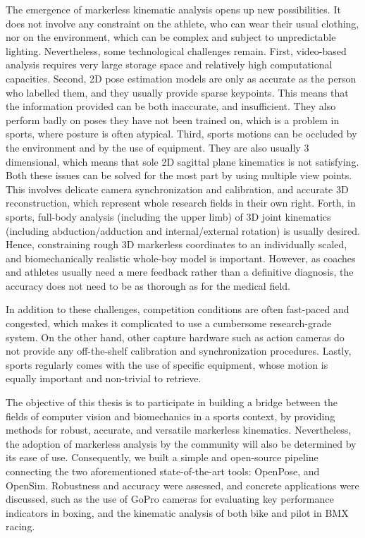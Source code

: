 The emergence of markerless kinematic analysis opens up new possibilities. It does not involve any constraint on the athlete, who can wear their usual clothing, nor on the environment, which can be complex and subject to unpredictable lighting. Nevertheless, some technological challenges remain. First, video-based analysis requires very large storage space and relatively high computational capacities. Second, 2D pose estimation models are only as accurate as the person who labelled them, and they usually provide sparse keypoints. This means that the information provided can be both inaccurate, and insufficient. They also perform badly on poses they have not been trained on, which is a problem in sports, where posture is often atypical. Third, sports motions can be occluded by the environment and by the use of equipment. They are also usually 3 dimensional, which means that sole 2D sagittal plane kinematics is not satisfying. Both these issues can be solved for the most part by using multiple view points. This involves delicate camera synchronization and calibration, and accurate 3D reconstruction, which represent whole research fields in their own right. Forth, in sports, full-body analysis (including the upper limb) of 3D joint kinematics (including abduction/adduction and internal/external rotation) is usually desired. Hence, constraining rough 3D markerless coordinates to an individually scaled, and biomechanically realistic whole-boy model is important. However, as coaches and athletes usually need a mere feedback rather than a definitive diagnosis, the accuracy does not need to be as thorough as for the medical field. 

In addition to these challenges, competition conditions are often fast-paced and congested, which makes it complicated to use a cumbersome research-grade system. On the other hand, other capture hardware such as action cameras do not provide any off-the-shelf calibration and synchronization procedures. Lastly, sports regularly comes with the use of specific equipment, whose motion is equally important and non-trivial to retrieve. 

The objective of this thesis is to participate in building a bridge between the fields of computer vision and biomechanics in a sports context, by providing methods for robust, accurate, and versatile markerless kinematics. Nevertheless, the adoption of markerless analysis by the community will also be determined by its ease of use. Consequently, we built a simple and open-source pipeline connecting the two aforementioned state-of-the-art tools: OpenPose, and OpenSim. Robustness and accuracy were assessed, and concrete applications were discussed, such as the use of GoPro cameras for evaluating key performance indicators in boxing, and the kinematic analysis of both bike and pilot in BMX racing.


